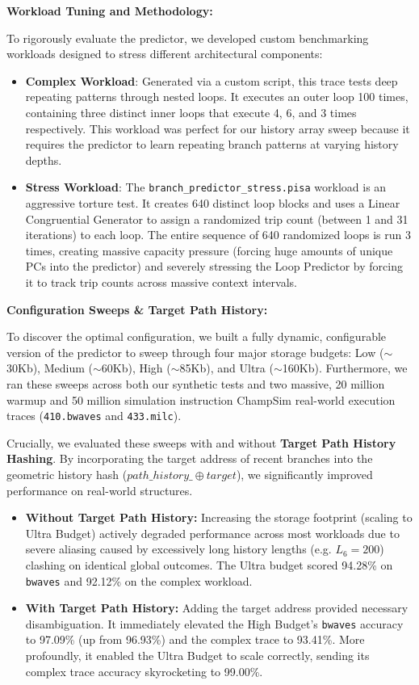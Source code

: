 \documentclass[11pt, a4paper]{article}
\begin{document}
\textbf{Workload Tuning and Methodology:}

To rigorously evaluate the predictor, we developed custom benchmarking workloads designed to stress different architectural components:

\begin{itemize}
    \item \textbf{Complex Workload}: Generated via a custom script, this trace tests deep repeating patterns through nested loops. It executes an outer loop 100 times, containing three distinct inner loops that execute 4, 6, and 3 times respectively. This workload was perfect for our history array sweep because it requires the predictor to learn repeating branch patterns at varying history depths. 
    \item \textbf{Stress Workload}: The \texttt{branch\_predictor\_stress.pisa} workload is an aggressive torture test. It creates 640 distinct loop blocks and uses a Linear Congruential Generator to assign a randomized trip count (between 1 and 31 iterations) to each loop. The entire sequence of 640 randomized loops is run 3 times, creating massive capacity pressure (forcing huge amounts of unique PCs into the predictor) and severely stressing the Loop Predictor by forcing it to track trip counts across massive context intervals.
\end{itemize}

\textbf{Configuration Sweeps \& Target Path History:}

To discover the optimal configuration, we built a fully dynamic, configurable version of the predictor to sweep through four major storage budgets: Low ($\sim$30Kb), Medium ($\sim$60Kb), High ($\sim$85Kb), and Ultra ($\sim$160Kb). Furthermore, we ran these sweeps across both our synthetic tests and two massive, 20 million warmup and 50 million simulation instruction ChampSim real-world execution traces (\texttt{410.bwaves} and \texttt{433.milc}).

Crucially, we evaluated these sweeps with and without \textbf{Target Path History Hashing}. By incorporating the target address of recent branches into the geometric history hash ($path\_history\_ \oplus target$), we significantly improved performance on real-world structures.

\begin{itemize}
    \item \textbf{Without Target Path History:} Increasing the storage footprint (scaling to Ultra Budget) actively degraded performance across most workloads due to severe aliasing caused by excessively long history lengths (e.g. $L_6 = 200$) clashing on identical global outcomes. The Ultra budget scored 94.28\% on \texttt{bwaves} and 92.12\% on the complex workload.
    \item \textbf{With Target Path History:} Adding the target address provided necessary disambiguation. It immediately elevated the High Budget's \texttt{bwaves} accuracy to 97.09\% (up from 96.93\%) and the complex trace to 93.41\%. More profoundly, it enabled the Ultra Budget to scale correctly, sending its complex trace accuracy skyrocketing to 99.00\%.
\end{itemize}
\end{document}
